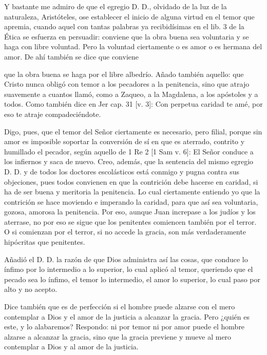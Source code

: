 Y bastante me admiro de que el egregio D. D., olvidado de la luz de la naturaleza, Aristóteles, ose establecer el inicio de alguna virtud en el temor que apremia, cuando aquel con tantas palabras ya recibidísimas en el lib. 3 de la Ética se esfuerza en persuadir: conviene que la obra buena sea voluntaria y se haga con libre voluntad. Pero la voluntad ciertamente o es amor o es hermana del amor. De ahí también se dice que conviene

que la obra buena se haga por el libre albedrío. Añado también aquello: que Cristo nunca obligó con temor a los pecadores a la penitencia, sino que atrajo suavemente a cuantos llamó, como a Zaqueo, a la Magdalena, a los apóstoles y a todos. Como también dice en Jer cap. 31 [v. 3]: Con perpetua caridad te amé, por eso te atraje compadeciéndote.

Digo, pues, que el temor del Señor ciertamente es necesario, pero filial, porque sin amor es imposible soportar la conversión de sí en que es aterrado, contrito y humillado el pecador, según aquello de 1 Re 2 [1 Sam v. 6]: El Señor conduce a los infiernos y saca de nuevo. Creo, además, que la sentencia del mismo egregio D. D. y de todos los doctores escolásticos está conmigo y pugna contra sus objeciones, pues todos convienen en que la contrición debe hacerse en caridad, si ha de ser buena y meritoria la penitencia. Lo cual ciertamente entiendo yo que la contrición se hace moviendo e imperando la caridad, para que así sea voluntaria, gozosa, amorosa la penitencia. Por eso, aunque Juan increpase a los judíos y los aterrase, no por eso se sigue que los penitentes comiencen también por el terror. O si comienzan por el terror, si no accede la gracia, son más verdaderamente hipócritas que penitentes.

Añadió el D. D. la razón de que Dios administra así las cosas, que conduce lo ínfimo por lo intermedio a lo superior, lo cual aplicó al temor, queriendo que el pecado sea lo ínfimo, el temor lo intermedio, el amor lo superior, lo cual paso por alto y no acepto.

Dice también que es de perfección si el hombre puede alzarse con el mero contemplar a Dios y el amor de la justicia a alcanzar la gracia. Pero ¿quién es este, y lo alabaremos? Respondo: ni por temor ni por amor puede el hombre alzarse a alcanzar la gracia, sino que la gracia previene y mueve al mero contemplar a Dios y al amor de la justicia.

